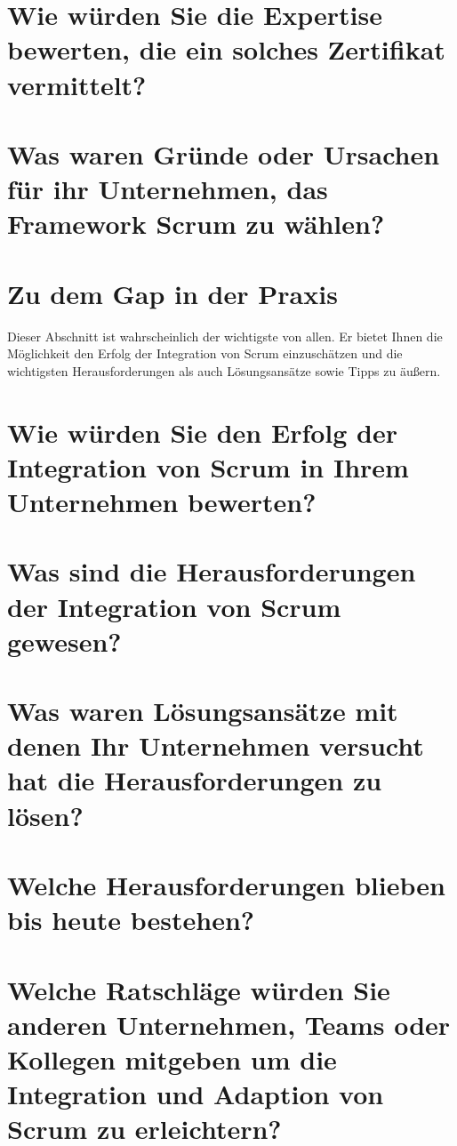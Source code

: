\section*{Wie würden Sie die Expertise bewerten, die ein solches Zertifikat vermittelt?}

\section*{Was waren Gründe oder Ursachen für ihr Unternehmen, das Framework Scrum zu wählen?}
\langantwort

\section*{Zu dem Gap in der Praxis}
Dieser Abschnitt ist wahrscheinlich der wichtigste von allen. Er bietet Ihnen die Möglichkeit den Erfolg der Integration von Scrum einzuschätzen und die wichtigsten Herausforderungen als auch Lösungsansätze sowie Tipps zu äußern. 

\section*{Wie würden Sie den Erfolg der Integration von Scrum in Ihrem Unternehmen bewerten?}

\section*{Was sind die Herausforderungen der Integration von Scrum gewesen?}
\langantwort

\section*{Was waren Lösungsansätze mit denen Ihr Unternehmen versucht hat die Herausforderungen zu lösen?}
\langantwort

\section*{Welche Herausforderungen blieben bis heute bestehen?}
\langantwort

\section*{Welche Ratschläge würden Sie anderen Unternehmen, Teams oder Kollegen mitgeben um die Integration und Adaption von Scrum zu erleichtern?}
\langantwort


